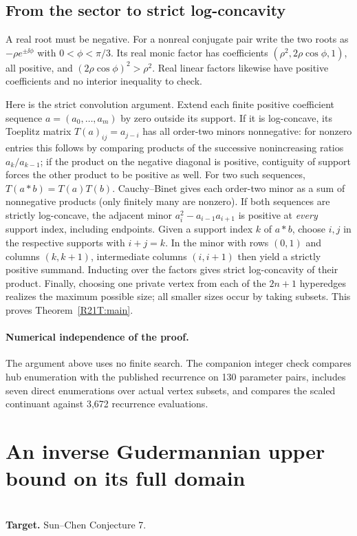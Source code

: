 \documentclass[11pt,a4paper]{article}
\begin{document}
\subsection{From the sector to strict log-concavity}
A real root must be negative. For a nonreal conjugate pair write the two
roots as $-\rho e^{\pm\ii\phi}$ with $0<\phi<\pi/3$. Its real monic
factor has coefficients $(\rho^2,2\rho\cos\phi,1)$, all positive,
and $(2\rho\cos\phi)^2>\rho^2$. Real linear factors likewise have
positive coefficients and no interior inequality to check.

Here is the strict convolution argument. Extend each finite positive
coefficient sequence $a=(a_0,\ldots,a_m)$ by zero outside its support.
If it is log-concave, its Toeplitz matrix $T(a)_{ij}=a_{j-i}$ has all
order-two minors nonnegative: for nonzero entries this follows by
comparing products of the successive nonincreasing ratios
$a_k/a_{k-1}$; if the product on the negative diagonal is positive,
contiguity of support forces the other product to be positive as well.
For two such sequences, $T(a*b)=T(a)T(b)$. Cauchy--Binet gives each
order-two minor as a sum of nonnegative products (only finitely many
are nonzero). If both sequences are strictly log-concave, the adjacent
minor $a_i^2-a_{i-1}a_{i+1}$ is positive at \emph{every} support index,
including endpoints. Given a support index $k$ of $a*b$, choose $i,j$ in
the respective supports with $i+j=k$. In the minor with rows $(0,1)$ and
columns $(k,k+1)$, intermediate columns $(i,i+1)$ then yield a strictly
positive summand. Inducting over the factors gives strict log-concavity
of their product. Finally, choosing one private vertex from each of the
$2n+1$ hyperedges realizes the maximum possible size; all smaller
sizes occur by taking subsets. This proves Theorem~\ref{R21T:main}.

\paragraph{Numerical independence of the proof.}
The argument above uses no finite search. The companion integer check
compares hub enumeration with the published recurrence on 130 parameter
pairs, includes seven direct enumerations over actual vertex subsets,
and compares the scaled continuant against 3,672 recurrence evaluations.
\endgroup


\clearpage

\section{An inverse Gudermannian upper bound on its full domain}
\label{section:R22S}
\\[3pt]
\noindent\textbf{Target.} Sun--Chen Conjecture 7.
\end{document}
